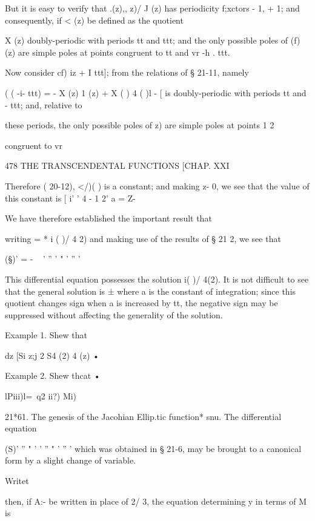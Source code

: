 But it is easy to verify that .(z),, z)/ J (z) has periodicity
f;xctors - 1, + 1; and consequently, if < (z) be defined as the
quotient

 X (z) %
doubly-periodic with periods tt and ttt; and the only possible poles
of (f) (z) are simple poles at points congruent to tt and vr -h . ttt.

Now consider cf) iz + I ttt]; from the relations of § 21-11, namely



( ( -i- ttt) = - X (z) 1 (z) + X ( ) 4 ( )l - [%
is doubly-periodic with periods tt and - ttt; and, relative to

these periods, the only possible poles of z) are simple poles at
points 1 2

congruent to vr

478 THE TRANSCENDENTAL FUNCTIONS [CHAP. XXI

Therefore ( 20-12), </)( ) is a constant; and making z- 0, we see that
the value of this constant is [ i' ' 4 - 1 2' a = Z-

We have therefore established the important result that

writing = * i ( )/ 4 2) and making use of the results of § 21 2, we
see that

(§)' = - ~ ' '' ' " ' '' '

This differential equation possesses the solution i( )/ 4(2). It is
not difficult to see that the general solution is ±%
where a is the constant of integration; since this quotient changes
sign when a is increased by tt, the negative sign may be suppressed
without affecting the generality of the solution.

Example 1. Shew that

dz [Si z;j 2 S4 (2) 4 (z) •

Example 2. Shew thcat •

lPiii)l=\ q2 ii?) Mi)

21*61. The genesis of the Jacohian Ellip.tic function* snu. The
differential equation

(S)' '' " ' ' '' " ' '' ' which was obtained in § 21-6, may be brought
to a canonical form by a slight change of variable.

Writet %

then, if A:- be written in place of 2/ 3, the equation determining y
in terms of M is

